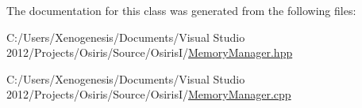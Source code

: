 The documentation for this class was generated from the following files\-:\begin{DoxyCompactItemize}
\item 
C\-:/\-Users/\-Xenogenesis/\-Documents/\-Visual Studio 2012/\-Projects/\-Osiris/\-Source/\-Osiris\-I/\hyperlink{_memory_manager_8hpp}{Memory\-Manager.\-hpp}\item 
C\-:/\-Users/\-Xenogenesis/\-Documents/\-Visual Studio 2012/\-Projects/\-Osiris/\-Source/\-Osiris\-I/\hyperlink{_memory_manager_8cpp}{Memory\-Manager.\-cpp}\end{DoxyCompactItemize}

